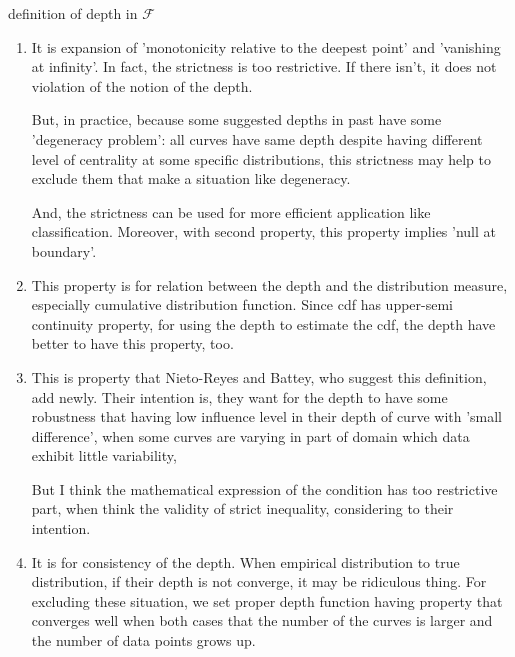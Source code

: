 \documentclass[aspectratio=169,ignorenonframetext,9pt]{beamer}
\theoremstyle{plain}
\theoremstyle{definition}
\begin{document}
\begin{frame}{definition of depth in $\mathcal{F}$}
\begin{enumerate}
    But, if strictly speaking, in general the notion - the center of the distribution on function space - has much ambiguousness itself,
    especially if we consider other distributions except gaussian or trivial ones with properties like stationary, having obvious mean, symmetric, continuous, etc.
    So, We can say that the definition above has similar problem.
    
    \item It is expansion of 'monotonicity relative to the deepest point' and 'vanishing at infinity'.
    In fact, the strictness is too restrictive. If there isn't, it does not violation of the notion of the depth.
    
    But, in practice, because some suggested depths in past have some 'degeneracy problem': all curves have
    same depth despite having different level of centrality at some specific distributions,
    this strictness may help to exclude them that make a situation like degeneracy.

    And, the strictness can be used for more efficient application like classification.
    Moreover, with second property, this property implies 'null at boundary'.

    \item This property is for relation between the depth and the distribution measure, especially 
    cumulative distribution function. Since cdf has upper-semi continuity property,
    for using the depth to estimate the cdf, the depth have better to have this property, too.

    \item This is property that Nieto-Reyes and Battey, who suggest this definition, add newly. 
    Their intention is, they want for the depth to have some robustness 
    that having low influence level in their depth of curve with 'small difference',
    when some curves are varying in part of domain which data exhibit little variability, 
    
    But I think the mathematical expression of the condition has too restrictive part,
    when think the validity of strict inequality, considering to their intention.

    \item It is for consistency of the depth. When empirical distribution to true distribution,
    if their depth is not converge, it may be ridiculous thing. For excluding these situation,
    we set proper depth function having property that converges well when both cases that 
    the number of the curves is larger and the number of data points grows up.
    
\end{enumerate}

\end{frame}
\end{document}
